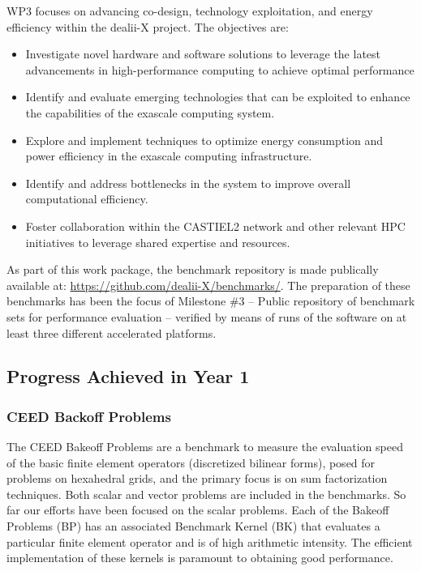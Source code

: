 \documentclass[a4paper,12pt, numbers]{article}
\begin{document}
WP3 focuses on advancing co-design, technology exploitation, and energy efficiency within the dealii-X project. The objectives are:

\begin{itemize}[left=1em, itemsep=0pt, topsep=0pt]
\item Investigate novel hardware and software solutions to leverage the latest advancements in high-performance computing to achieve optimal performance
\item Identify and evaluate emerging technologies that can be exploited to enhance the capabilities of the exascale computing system.
\item Explore and implement techniques to optimize energy consumption and power efficiency in the exascale computing infrastructure.
\item Identify and address bottlenecks in the system to improve overall computational efficiency.
\item Foster collaboration within the CASTIEL2 network and other relevant HPC initiatives to leverage shared expertise and resources.
\end{itemize}

As part of this work package, the benchmark repository is made publically available at: \url{https://github.com/dealii-X/benchmarks/}. The preparation of these benchmarks has been the focus of Milestone \#3 -- Public repository of benchmark sets for performance evaluation -- verified by means of runs of the software on at least three different accelerated platforms.


\subsection{Progress Achieved in Year 1} %

\subsubsection*{CEED Backoff Problems}

The CEED Bakeoff Problems are a benchmark to measure the evaluation speed of the basic finite element operators (discretized bilinear forms), posed for problems on hexahedral grids, and the primary focus is on sum factorization techniques.  Both scalar and vector problems are included in the benchmarks. So far our efforts have been focused on the scalar problems. Each of the Bakeoff Problems (BP) has an associated Benchmark Kernel (BK) that evaluates a particular finite element operator and is of high arithmetic intensity.  The efficient implementation of these kernels is paramount to obtaining good performance.
\end{document}
